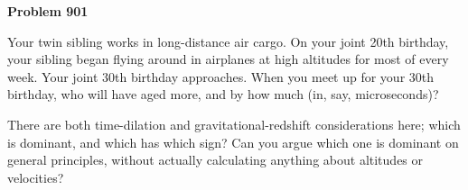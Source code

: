 \documentclass[12pt]{article}
\begin{document}
\begin{pottproblem}
\textbf{Problem 901}

Your twin sibling works in long-distance air cargo.
On your joint 20th birthday, your sibling began 
flying around in airplanes at high altitudes for most of every week.
Your joint 30th birthday approaches.
When you meet up for your 30th birthday, who will have aged more, and
by how much (in, say, microseconds)?

There are both time-dilation and gravitational-redshift considerations
here; which is dominant, and which has which sign?
Can you argue which one is dominant on general principles,
without actually calculating anything about altitudes or velocities?

\end{pottproblem}
\end{document}
